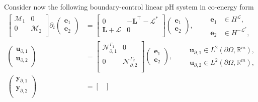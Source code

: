 Consider now the following boundary-control linear pH system in co-energy form 
\begin{subequations}
	\label{eq:pHlinsys_mixed}
\begin{align}
\begin{bmatrix}
\mathcal{M}_1 & 0 \\
0 & \mathcal{M}_2 \\
\end{bmatrix}
\partial_t \begin{pmatrix}
\bm{e}_1 \\ \bm{e}_2
\end{pmatrix} &= \begin{bmatrix}
0 & -\bm{L}^\top - \mathcal{L}^* \\
\bm{L} + \mathcal{L} & 0 \\
\end{bmatrix}\begin{pmatrix}
\bm{e}_1 \\ \bm{e}_2
\end{pmatrix} , \qquad \begin{aligned}
\bm{e}_1 &\in H^{\mathcal{L}}, 	\\
\bm{e}_2 &\in H^{-\mathcal{L}^*},
\end{aligned} \label{eq:pHlinsys_dyn_mixed}\\
\begin{pmatrix}
\bm{u}_{\partial, 1}\\
\bm{u}_{\partial, 2}\\
\end{pmatrix} &= \begin{bmatrix}
\mathcal{N}_{\partial, 1}^{\Gamma_1} & 0\\
0 & \mathcal{N}_{\partial, 2}^{\Gamma_2} \\
\end{bmatrix} \begin{pmatrix}
\bm{e}_1 \\ \bm{e}_2
\end{pmatrix}, \qquad 
\begin{aligned}
\bm{u}_{\partial, 1} \in L^2(\partial\Omega, \mathbb{R}^{m}),\\
\bm{u}_{\partial, 2} \in L^2(\partial\Omega, \mathbb{R}^{m}),
\end{aligned} \\
\begin{pmatrix}
\bm{y}_{\partial, 1}\\
\bm{y}_{\partial, 2}\\
\end{pmatrix} &= \begin{bmatrix}

\end{bmatrix}
\end{align}
\end{subequations}
